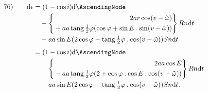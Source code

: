 \[
\begin{array}{rl}
76)\quad&\begin{aligned}[t]\mathrm{d}\epsilon&=(1-\cos i)\mathrm{d}\AscendingNode\\
&\quad-\left\{\begin{aligned}2ar\cos(v-\tilde\omega)\\
{}+aa\operatorname{tang}\tfrac12\varphi(\cos\varphi+\sin E\mathbin{.}\sin(v-\tilde\omega))\end{aligned}\right\}Rn\mathrm{d}t\\
&\quad-aa\sin E(2\cos\varphi-\operatorname{tang}\tfrac12\varphi\mathbin{.}\cos(v-\tilde\omega))Sn\mathrm{d}t\\[4pt]
&=(1-\cos i)\mathrm{d}\AscendingNode\\
&\quad-\left\{\begin{aligned}2aa\cos E\\
{}-aa\operatorname{tang}\tfrac12\varphi(2+\cos\varphi\mathbin{.}\cos E\mathbin{.}\cos(v-\tilde\omega))\end{aligned}\right\}Rn\mathrm{d}t\\
&\quad-aa\sin E(2\cos\varphi-\operatorname{tang}\tfrac12\varphi\mathbin{.}\cos(v-\tilde\omega))Sn\mathrm{d}t.\end{aligned}
\end{array}
\]
